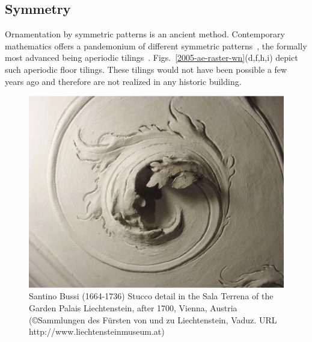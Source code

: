 \documentclass[rmp,amssymb,showpacs,showkeys,12pt,preprint]{revtex4}
\begin{document}
\subsection{Symmetry}

Ornamentation by symmetric patterns is an ancient method.
Contemporary mathematics offers a pandemonium of different symmetric patterns~\cite{gruenbaum-tiling},
the formally most advanced being aperiodic tilings~\cite{baake-02,grimm-schr-02}.
Figs.~\ref{2005-ae-raster-wn}(d,f,h,i) depict such aperiodic floor tilings.
These tilings would not have been possible a few years ago and therefore are not realized in any historic building.














\begin{figure}
\centerline{\includegraphics[width=12cm]{2008-ae-bospiral}}
   \caption{Santino Bussi (1664-1736) Stucco detail in the Sala Terrena of the Garden Palais
 Liechtenstein, after 1700, Vienna, Austria
(\copyright Sammlungen des F\"ursten von und zu Liechtenstein, Vaduz.
URL http://www.liechtensteinmuseum.at)}
   \label{2005-ae-bospiral}
 \end{figure}
\end{document}
